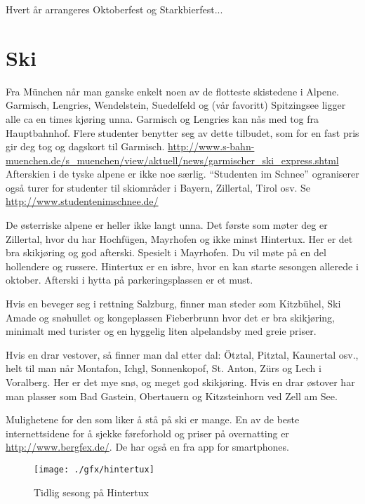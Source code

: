 Hvert år arrangeres Oktoberfest og Starkbierfest...




\section{Ski}
Fra München når man ganske enkelt noen av de flotteste skistedene i Alpene. Garmisch, Lengries, Wendelstein, Suedelfeld og (vår favoritt) Spitzingsee ligger alle ca en times kjøring unna.
Garmisch og Lengries kan nås med tog fra Hauptbahnhof.  Flere studenter benytter seg av dette tilbudet, som for en fast pris gir deg tog og dagskort til Garmisch. \url{http://www.s-bahn-muenchen.de/s_muenchen/view/aktuell/news/garmischer_ski_express.shtml} \\
Afterskien i de tyske alpene er ikke noe særlig. ``Studenten im Schnee'' ograniserer også turer for studenter til skiområder i Bayern, Zillertal, Tirol osv. Se \url{http://www.studentenimschnee.de/}


De østerriske alpene er heller ikke langt unna. Det første som møter deg er Zillertal, hvor du har Hochfügen, Mayrhofen og ikke minst Hintertux. Her er det bra skikjøring og god afterski. Spesielt i Mayrhofen. Du vil møte på en del hollendere og russere. Hintertux er en isbre, hvor en kan starte sesongen allerede i oktober. Afterski i hytta på parkeringsplassen er et must.





Hvis en beveger seg i rettning Salzburg, finner man steder som Kitzbühel, Ski Amade og snøhullet og kongeplassen Fieberbrunn hvor det er bra skikjøring, minimalt med turister og en hyggelig liten alpelandsby med greie priser.

Hvis en drar vestover, så finner man dal etter dal: Ötztal, Pitztal, Kaunertal osv., helt til man når Montafon, Ichgl, Sonnenkopof, St. Anton, Zürs og Lech i Voralberg. Her er det mye snø, og meget god skikjøring. Hvis en drar østover har man plasser som Bad Gastein, Obertauern og Kitzsteinhorn ved Zell am See.

Mulighetene for den som liker å stå på ski er mange. En av de beste internettsidene for å sjekke føreforhold og priser på overnatting er \url{http://www.bergfex.de/}. De har også en fra app for smartphones.

\begin{figure}[h]
\center
\texttt{[image: ./gfx/hintertux]}
\caption{Tidlig sesong på Hintertux}
\end{figure}
